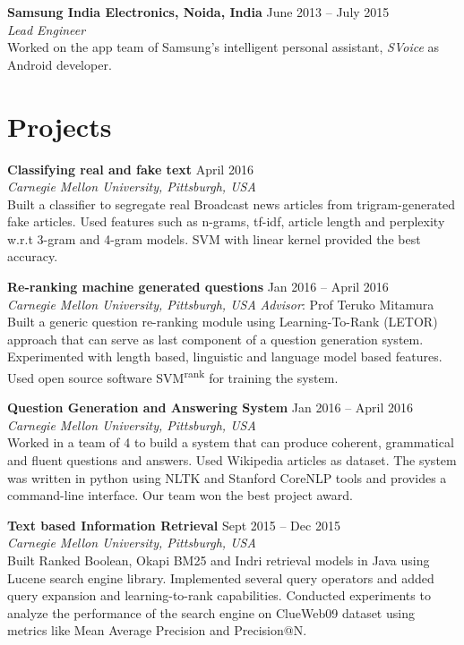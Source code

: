 \documentclass[margin,line]{resume}
\begin{document}
\begin{resume}
		\textbf{Samsung India Electronics, Noida, India} \hfill June 2013 -- July 2015\\
		\textit{Lead Engineer}\\
		Worked on the app team of Samsung's intelligent personal assistant, \textit{SVoice} as Android developer.
		 
\section{\mysidestyle Projects}
        \textbf{Classifying real and fake text} 
        \hfill April 2016\\
  		\textit{Carnegie Mellon University, Pittsburgh, USA}\\
	    Built a classifier to segregate real Broadcast news articles from trigram-generated fake articles. Used features such as n-grams, tf-idf, article length and  perplexity w.r.t 3-gram and 4-gram models. SVM with linear kernel provided the best accuracy. 
	    
        \textbf{Re-ranking machine generated questions} \hfill Jan 2016 -- April 2016\\
  		\textit{Carnegie Mellon University, Pittsburgh, USA} \hfill \textit{Advisor}: Prof Teruko Mitamura\\
	     Built a generic question re-ranking module using Learning-To-Rank (LETOR) approach that can serve as last component of a question generation system. Experimented with length based, linguistic and language model based features. Used open source software SVM\textsuperscript{rank} for training the system. 
        
        \textbf{Question Generation and Answering System} \hfill Jan 2016 -- April 2016 \\
  		\textit{Carnegie Mellon University, Pittsburgh, USA}\\
	     Worked in a team of 4 to build a system that can produce coherent, grammatical and fluent questions and answers. Used Wikipedia articles as dataset. The system was written in python using NLTK and Stanford CoreNLP tools and provides a command-line interface. Our team won the best project award. 

		\textbf{Text based Information Retrieval} \hfill Sept 2015 -- Dec 2015 \\
  		\textit{Carnegie Mellon University, Pittsburgh, USA}\\
	     Built Ranked Boolean, Okapi BM25 and Indri retrieval models in Java using Lucene search engine library. Implemented several query operators and added query expansion and learning-to-rank capabilities. Conducted experiments to analyze the performance of the search engine on ClueWeb09 dataset using metrics like Mean Average Precision and Precision@N.


\end{resume}
\end{document}
